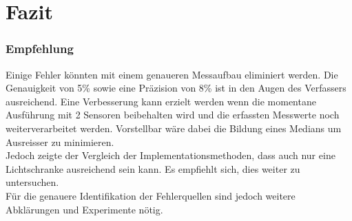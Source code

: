 \part{Fazit}
\section{Empfehlung}
Einige Fehler könnten mit einem genaueren Messaufbau eliminiert werden.
Die Genauigkeit von 5\% sowie eine Präzision von 8\% ist in den Augen des Verfassers ausreichend. Eine Verbesserung kann erzielt werden wenn die momentane Ausführung mit 2 Sensoren beibehalten wird und die erfassten Messwerte noch weiterverarbeitet werden. Vorstellbar wäre dabei die Bildung eines Medians um Ausreisser zu minimieren.\\

Jedoch zeigte der Vergleich der Implementationsmethoden, dass auch nur eine Lichtschranke ausreichend sein kann. Es empfiehlt sich, dies weiter zu untersuchen.\\

Für die genauere Identifikation der Fehlerquellen sind jedoch weitere Abklärungen und Experimente nötig.\\